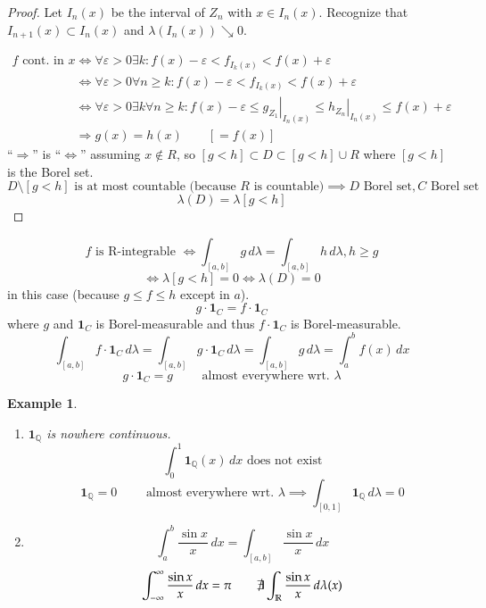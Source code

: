 \documentclass[a4paper]{article}
\newcounter{lecref}[section]
\numberwithin{lecref}{section}
\theoremstyle{break}
\newtheorem{example}[lecref]{Example}
\begin{document}
\begin{proof}
  Let $I_n(x)$ be the interval of $Z_n$ with $x \in I_n(x)$.
  Recognize that $I_{n+1}(x) \subset I_n(x)$ and $\lambda(I_n(x)) \searrow 0$.

  \begin{align*}
    f \text{ cont. in } x
      &\iff \forall \varepsilon > 0 \exists k: f(x) - \varepsilon < f_{I_k(x)} < f(x) + \varepsilon \\
      &\iff \forall \varepsilon > 0 \forall n \geq k: f(x) - \varepsilon < f_{I_k(x)} < f(x) + \varepsilon \\
      &\iff \forall \varepsilon > 0 \exists k \forall n \geq k: f(x) - \varepsilon \leq \left. g_{Z_1} \right|_{I_n(x)} \leq \left. h_{Z_n} \right|_{I_n(x)} \leq f(x) + \varepsilon \\
      &\Rightarrow g(x) = h(x) \qquad [= f(x)]
  \end{align*}
  \enquote{$\Rightarrow$} is \enquote{$\iff$} assuming $x \not\in R$,
  so $[g < h] \subset D \subset [g < h] \cup R$ where $[g < h]$ is the Borel set.
  \[ D \setminus [g < h] \text{ is at most countable (because $R$ is countable)} \implies D \text{ Borel set}, C \text{ Borel set} \]
  \[ \lambda(D) = \lambda[g < h] \]
\end{proof}

\[ f \text{ is R-integrable } \iff \int_{[a,b]} g \, d\lambda = \int_{[a,b]} h \, d\lambda, h \geq g \]
\[ \iff \lambda[g < h] = 0 \iff \lambda(D) = 0 \]
in this case (because $g \leq f \leq h$ except in $a$).
\[ g \cdot \mathbf{1}_C = f \cdot \mathbf{1}_C \]
where $g$ and $\mathbf{1}_C$ is Borel-measurable and thus $f \cdot \mathbf{1}_C$ is Borel-measurable.
\[ \int_{[a,b]} f \cdot \mathbf{1}_C \, d\lambda = \int_{[a,b]} g \cdot \mathbf{1}_C \, d\lambda = \int_{[a,b]} g \, d\lambda = \int_a^b f(x) \, dx \]
\[ g \cdot \mathbf{1}_C = g \qquad \text{ almost everywhere wrt. } \lambda \]

\begin{example}
  \begin{enumerate}
    \item $\mathbf{1}_{\mathbb Q}$ is nowhere continuous.
      \[ \int_0^1 \mathbf{1}_{\mathbb Q}(x) \, dx \text{ does not exist} \]
      \[ \mathbf{1}_{\mathbb Q} = 0 \qquad \text{ almost everywhere wrt. } \lambda \implies \int_{[0,1]} \mathbf{1}_{\mathbb Q} \, d\lambda = 0 \]
    \item
      \[ \int_a^b \frac{\sin{x}}{x} \, dx = \int_{[a,b]} \frac{\sin{x}}{x} \, dx \]
      \[ \int_{-\infty}^\infty \frac{\sin{x}}{x} \, dx = \pi \qquad \not\exists \int_{\mathbb R} \frac{\sin{x}}{x} \, d\lambda(x) \]
  \end{enumerate}
\end{example}
\end{document}
